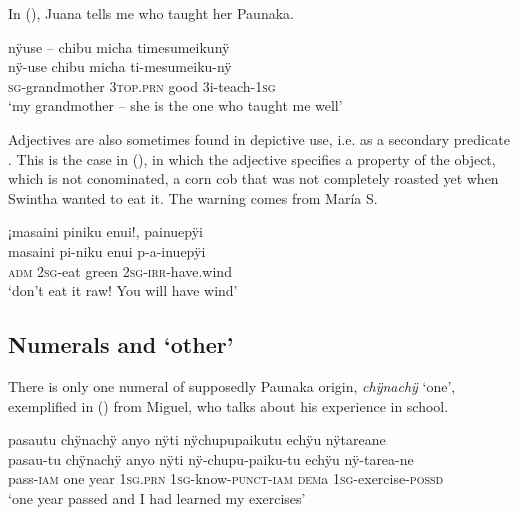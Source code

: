 In (), Juana tells me who taught her Paunaka.

\ea\label{ex:ADJ-Adv-2}
\begingl
\glpreamble nÿuse – chibu micha timesumeikunÿ\\
\gla nÿ-use chibu micha ti-mesumeiku-nÿ\\
\textsc{sg}-grandmother 3\textsc{top.prn} good 3i-teach-1\textsc{sg}\\
\glft ‘my grandmother – she is the one who taught me well’
\endgl
\trailingcitation{[jxx-p120430l-1.050-051]}
\xe

Adjectives are also sometimes found in depictive use, i.e. as a secondary predicate \citep[cf.][]{Schultze-Berndt2004}. This is the case in (), in which the adjective specifies a property of the object, which is not conominated, a corn cob that was not completely roasted yet when Swintha wanted to eat it. The warning comes from María S.

\ea\label{ex:ADJ-Dep-1}
\begingl
\glpreamble ¡masaini piniku enui!, painuepÿi\\
\gla masaini pi-niku enui p-a-inuepÿi\\
\glb \textsc{adm} 2\textsc{sg}-eat green 2\textsc{sg}-\textsc{irr}-have.wind\\
\glft ‘don’t eat it raw! You will have wind’
\endgl
\trailingcitation{[rxx-e150220s-1.25]}
\xe

\subsection{Numerals and ‘other’}\label{sec:Numerals}

There is only one numeral of supposedly Paunaka origin, \textit{chÿnachÿ} ‘one’, exemplified in () from Miguel, who talks about his experience in school.

\ea\label{ex:one-3}
\begingl
\glpreamble pasautu chÿnachÿ anyo nÿti nÿchupupaikutu echÿu nÿtareane\\
\gla pasau-tu chÿnachÿ anyo nÿti nÿ-chupu-paiku-tu echÿu nÿ-tarea-ne\\
\glb pass-\textsc{iam} one year 1\textsc{sg.prn} 1\textsc{sg}-know-\textsc{punct}-\textsc{iam} \textsc{dem}a 1\textsc{sg}-exercise-\textsc{possd}\\
\glft ‘one year passed and I had learned my exercises’
\endgl
\trailingcitation{[mxx-p181027l-1.087]}
\xe


